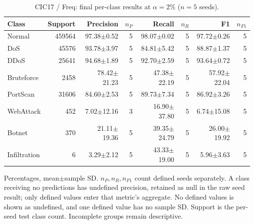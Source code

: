 \begin{table}[t]
\centering\scriptsize
\setlength{\tabcolsep}{3.3pt}
\caption{CIC17 / Freq: final per-class results at $\alpha=2\%$ ($n=5$ seeds).}\label{tab:forgetting-class-cic_ids_2017-freq}
\begin{tabular}{lrrrrrrr}
\toprule
Class & Support & Precision & $n_P$ & Recall & $n_R$ & F1 & $n_{F1}$ \\
\midrule
Normal & 459564 & 97.38$\pm$0.52 & 5 & 98.07$\pm$0.02 & 5 & 97.72$\pm$0.26 & 5 \\
DoS & 45576 & 93.78$\pm$3.97 & 5 & 84.81$\pm$5.42 & 5 & 88.87$\pm$1.37 & 5 \\
DDoS & 25641 & 94.68$\pm$1.89 & 5 & 92.70$\pm$2.59 & 5 & 93.64$\pm$0.72 & 5 \\
Bruteforce & 2458 & 78.42$\pm$21.23 & 5 & 47.38$\pm$22.19 & 5 & 57.92$\pm$22.04 & 5 \\
PortScan & 31606 & 84.60$\pm$2.53 & 5 & 89.73$\pm$7.34 & 5 & 86.92$\pm$3.26 & 5 \\
WebAttack & 452 & 7.02$\pm$12.16 & 3 & 16.90$\pm$37.80 & 5 & 6.74$\pm$15.08 & 5 \\
Botnet & 370 & 21.11$\pm$19.36 & 5 & 39.35$\pm$24.79 & 5 & 26.00$\pm$19.92 & 5 \\
Infiltration & 6 & 3.29$\pm$2.12 & 5 & 43.33$\pm$19.00 & 5 & 5.96$\pm$3.63 & 5 \\
\bottomrule
\end{tabular}
\par\smallskip\begin{minipage}{0.98\textwidth}\scriptsize Percentages, mean$\pm$sample SD. $n_P,n_R,n_{F1}$ count defined seeds separately. A class receiving no predictions has undefined precision, retained as null in the raw seed result; only defined values enter that metric's aggregate. No defined values is shown as undefined, and one defined value has no sample SD. Support is the per-seed test class count. Incomplete groups remain descriptive.\end{minipage}
\end{table}

